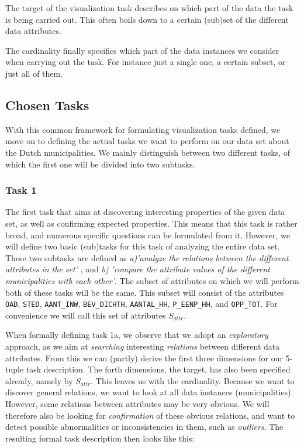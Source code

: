 The target of the visualization task describes on which part of the data the task is being carried out. This often boils down to a certain (sub)set of the different data attributes.

The cardinality finally specifies which part of the data instances we consider when carrying out the task. For instance just a single one, a certain subset, or just all of them.


\subsection{Chosen Tasks}
With this common framework for formulating visualization tasks defined, we move on to defining the actual tasks we want to perform on our data set about the Dutch municipalities. We mainly distinguish between two different tasks, of which the first one will be divided into two subtasks.

\subsubsection{Task 1}\label{sec:task1}
The first task that aims at discovering interesting properties of the given data set, as well as confirming expected properties. This means that this task is rather broad, and numerous specific questions can be formulated from it. However, we will define two basic (sub)tasks for this task of analyzing the entire data set. These two subtasks are defined as \textit{a)'analyze the relations between the different attributes in the set'} , and \textit{b) 'compare the attribute values of the different municipalities with each other'}. The subset of attributes on which we will perform both of these tasks will be the same. This subset will consist of the attributes \texttt{OAD}, \texttt{STED}, \texttt{AANT\_INW}, \texttt{BEV\_DICHTH}, \texttt{AANTAL\_HH}, \texttt{P\_EENP\_HH}, and \texttt{OPP\_TOT}. For convenience we will call this set of attributes $S_{attr}$.

When formally defining task 1a, we observe that we adopt an \textit{exploratory} approach, as we aim at \textit{searching} interesting \textit{relations} between different data attributes. From this we can (partly) derive the first three dimensions for our 5-tuple task description. The forth dimensions, the target, has also been specified already, namely by $S_{attr}$. This leaves us with the cardinality. Because we want to discover general relations, we want to look at all data instances (municipalities). However, some relations between attributes may be very obvious. We will therefore also be looking for \textit{confirmation} of these obvious relations, and want to detect possible abnormalities or inconsistencies in them, such as \textit{outliers}. The resulting formal task description then looks like this:

